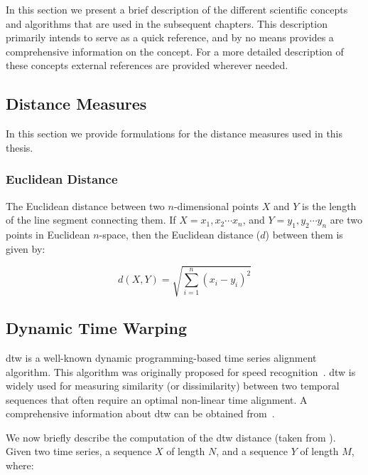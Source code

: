 In this section we present a brief description of the different scientific concepts and algorithms that are used in the subsequent chapters. This description primarily intends to serve as a quick reference, and by no means provides a comprehensive information on the concept. For a more detailed description of these concepts external references are provided wherever needed.

\subsection{Distance Measures}
\label{sec:distance_measures}

In this section we provide formulations for the distance measures used in this thesis. 

\subsubsection{Euclidean Distance}
\label{sec:euclidean_distance}

The Euclidean distance between two $n$-dimensional points $X$ and $Y$ is the length of the line segment connecting them. If $X=x_1, x_2\cdots x_n$, and $Y=y_1, y_2\cdots y_n$ are two points in Euclidean $n$-space, then the Euclidean distance ($d$) between them is given by:

\begin{equation}
\label{eq:euclidean_distance}
	d(X,Y) = \sqrt{\sum_{i=1}^{n}(x_i-y_i)^2}	
\end{equation}



\subsection{Dynamic Time Warping}
\label{sec_DTW_distance_measure}

\Acrfull{dtw} is a well-known dynamic programming-based time series alignment algorithm. This algorithm was originally proposed for speed recognition~\citep{Sakoe78TASLP}. \Gls{dtw} is widely used for measuring similarity (or dissimilarity) between two temporal sequences that often require an optimal non-linear time alignment. A comprehensive information about \gls{dtw} can be obtained from~\cite{muller2007dynamic}. 

We now briefly describe the computation of the \gls{dtw} distance (taken from \cite{Keogh2004,muller2007dynamic}). Given two time series, a sequence  $X$ of length $N$, and a sequence $Y$ of length $M$, where:


